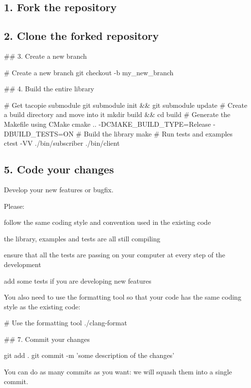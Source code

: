 \subsection*{1. Fork the repository}

\subsection*{2. Clone the forked repository}

\#\# 3. Create a new branch 
\begin{DoxyCode}
# Create a new branch
git checkout -b my\_new\_branch
\end{DoxyCode}


\#\# 4. Build the entire library 
\begin{DoxyCode}
# Get tacopie submodule
git submodule init && git submodule update
# Create a build directory and move into it
mkdir build && cd build
# Generate the Makefile using CMake
cmake .. -DCMAKE\_BUILD\_TYPE=Release -DBUILD\_TESTS=ON
# Build the library
make
# Run tests and examples
ctest -VV
./bin/subscriber
./bin/client
\end{DoxyCode}


\subsection*{5. Code your changes}

Develop your new features or bugfix.

Please\+:
\begin{DoxyItemize}
\item follow the same coding style and convention used in the existing code
\item the library, examples and tests are all still compiling
\item ensure that all the tests are passing on your computer at every step of the development
\item add some tests if you are developing new features
\end{DoxyItemize}

You also need to use the formatting tool so that your code has the same coding style as the existing code\+:


\begin{DoxyCode}
# Use the formatting tool
./clang-format
\end{DoxyCode}


\#\# 7. Commit your changes 
\begin{DoxyCode}
git add .
git commit -m 'some description of the changes'
\end{DoxyCode}
 You can do as many commits as you want\+: we will squash them into a single commit.

